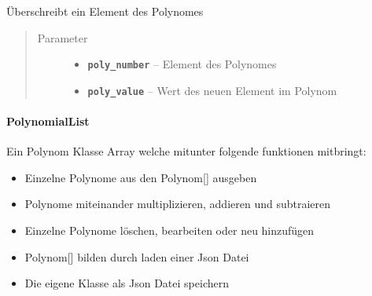 \documentclass[letterpaper,10pt,ngerman]{sphinxmanual}
\begin{document}
\begin{fulllineitems}
\label{com/linuxluigi/polynomial/Polynomial:com.linuxluigi.polynomial.Polynomial.set(int, double)}
Überschreibt ein Element des Polynomes
\begin{quote}\begin{description}
\item[{Parameter}] \leavevmode\begin{itemize}
\item {} 
\textbf{\texttt{poly\_number}} -- Element des Polynomes

\item {} 
\textbf{\texttt{poly\_value}} -- Wert des neuen Element im Polynom

\end{itemize}

\end{description}\end{quote}

\end{fulllineitems}



\paragraph{PolynomialList}
\label{com/linuxluigi/polynomial/PolynomialList:polynomiallist}\label{com/linuxluigi/polynomial/PolynomialList::doc}

\begin{fulllineitems}
\label{com/linuxluigi/polynomial/PolynomialList:com.linuxluigi.polynomial.PolynomialList}
Ein Polynom Klasse Array welche mitunter folgende funktionen mitbringt:
\begin{itemize}
\item {} 
Einzelne Polynome aus den Polynom{[}{]} ausgeben

\item {} 
Polynome miteinander multiplizieren, addieren und subtraieren

\item {} 
Einzelne Polynome löschen, bearbeiten oder neu hinzufügen

\item {} 
Polynom{[}{]} bilden durch laden einer Json Datei

\item {} 
Die eigene Klasse als Json Datei speichern

\end{itemize}

\end{fulllineitems}
\end{document}
